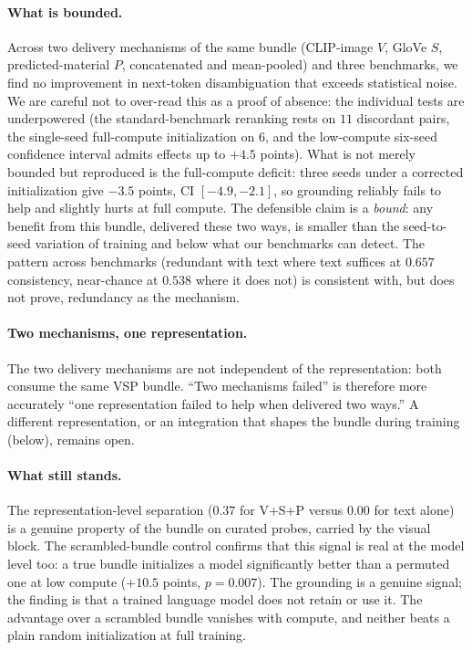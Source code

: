 \documentclass[twoside,11pt]{article}
\begin{document}
\paragraph{What is bounded.}
Across two delivery mechanisms of the same bundle (CLIP-image $V$, GloVe $S$, predicted-material $P$, concatenated and mean-pooled) and three benchmarks, we find no improvement in next-token disambiguation that exceeds statistical noise. We are careful not to over-read this as a proof of absence: the individual tests are underpowered (the standard-benchmark reranking rests on $11$ discordant pairs, the single-seed full-compute initialization on $6$, and the low-compute six-seed confidence interval admits effects up to $+4.5$ points). What is not merely bounded but reproduced is the full-compute deficit: three seeds under a corrected initialization give $-3.5$ points, CI $[-4.9, -2.1]$, so grounding reliably fails to help and slightly hurts at full compute. The defensible claim is a \emph{bound}: any benefit from this bundle, delivered these two ways, is smaller than the seed-to-seed variation of training and below what our benchmarks can detect. The pattern across benchmarks (redundant with text where text suffices at $0.657$ consistency, near-chance at $0.538$ where it does not) is consistent with, but does not prove, redundancy as the mechanism.

\paragraph{Two mechanisms, one representation.}
The two delivery mechanisms are not independent of the representation: both consume the same VSP bundle. ``Two mechanisms failed'' is therefore more accurately ``one representation failed to help when delivered two ways.'' A different representation, or an integration that shapes the bundle during training (below), remains open.

\paragraph{What still stands.}
The representation-level separation ($0.37$ for V+S+P versus $0.00$ for text alone) is a genuine property of the bundle on curated probes, carried by the visual block. The scrambled-bundle control confirms that this signal is real at the model level too: a true bundle initializes a model significantly better than a permuted one at low compute ($+10.5$ points, $p = 0.007$). The grounding is a genuine signal; the finding is that a trained language model does not retain or use it. The advantage over a scrambled bundle vanishes with compute, and neither beats a plain random initialization at full training.
\end{document}
